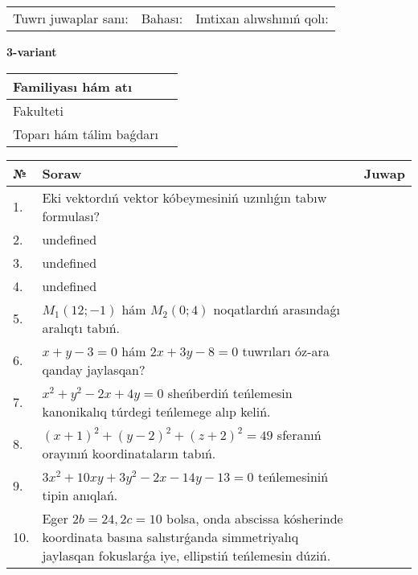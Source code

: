 \documentclass{article}
\begin{document}
\begin{tabular}{lll}
Tuwrı juwaplar sanı: \underline{\hspace{1cm}} & 
Bahası: \underline{\hspace{1cm}} & 
Imtixan alıwshınıń qolı: \underline{\hspace{2cm}} \\
\end{tabular}

\egroup

\newpage


\textbf{3-variant}\\

\bgroup
\def\arraystretch{1.6} %

\begin{tabular}{|m{5.7cm}|m{9.5cm}|}
\hline
Familiyası hám atı & \\
\hline
Fakulteti  & \\
\hline
Toparı hám tálim baǵdarı  & \\
\hline
\end{tabular}

\vspace{0.7cm}

\begin{tabular}{|m{0.7cm}|m{10cm}|m{4cm}|}
\hline
№ & Soraw & Juwap \\
\hline
1. & Eki vektordıń vektor kóbeymesiniń uzınlıǵın tabıw formulası? &  \\
\hline
2. & undefined &  \\
\hline
3. & undefined &  \\
\hline
4. & undefined &  \\
\hline
5. & \(M_{1} (12; - 1)\) hám \(M_{2} (0;4)\) noqatlardıń arasındaǵı aralıqtı tabıń. &  \\
\hline
6. & \(x + y - 3 = 0\) hám \(2 x + 3 y - 8 = 0\) tuwrıları óz-ara qanday jaylasqan? &  \\
\hline
7. & \(x^{2} + y^{2} - 2 x + 4 y = 0\) sheńberdiń teńlemesin kanonikalıq túrdegi teńlemege alıp keliń. &  \\
\hline
8. & \((x + 1) ^{2} + (y - 2) ^{2} + (z + 2) ^{2} = 49\) sferanıń orayınıń koordinataların tabıń. &  \\
\hline
9. & \(3 x^{2} + 10 xy + 3 y^{2} - 2 x - 14 y - 13 = 0\) teńlemesiniń tipin anıqlań. &  \\
\hline
10. & Eger \(2 b = 24, 2 c = 10\) bolsa, onda abscissa kósherinde koordinata basına salıstırǵanda simmetriyalıq jaylasqan fokuslarǵa iye, ellipstiń teńlemesin dúziń. & \\
\hline
\end{tabular}
\end{document}
